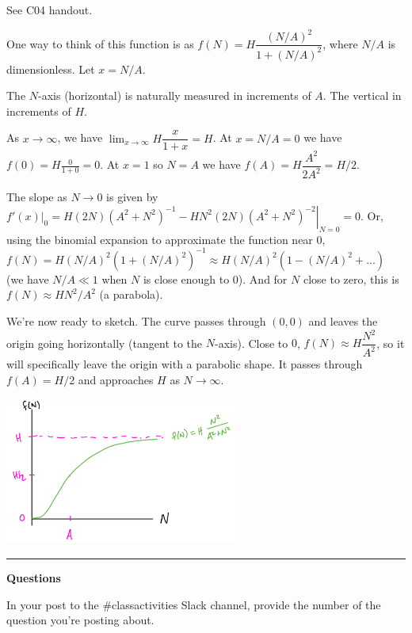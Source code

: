 \documentclass[12pt,letterpaper,noanswers]{exam}
\begin{document}
\begin{questions}
\question See C04 handout.
\question 

One way to think of this function is as $f(N) = H \dfrac{(N/A)^2}{1+(N/A)^2}$, where $N/A$ is dimensionless.  Let $ x = N/A$.  

The $N$-axis (horizontal) is naturally measured in increments of $A$.  The vertical in increments of $H$.  

As $x\rightarrow \infty$, we have $\lim_{x\rightarrow \infty} H \dfrac{x}{1+x} = H$.  At $x = N/A = 0$ we have $f(0) = H\frac{0}{1+0} = 0$.  At $x = 1$ so $N = A$ we have $f(A) = H\dfrac{A^2}{2A^2} = H/2$.  

The slope as $N\rightarrow 0$ is given by $\left.f'(x)\right\vert_0 = \left.H(2N)(A^2+N^2)^{-1}-HN^2(2N)(A^2+N^2)^{-2}\right\vert_{N=0} = 0$.  Or, using the binomial expansion to approximate the function near $0$, $f(N)= H(N/A)^2(1+(N/A)^2)^{-1} \approx H(N/A)^2(1 - (N/A)^2 + ...)$ (we have $N/A \ll 1$ when $N$ is close enough to $0$).  And for $N$ close to zero, this is $f(N) \approx HN^2/A^2$ (a parabola).

We're now ready to sketch.  The curve passes through $(0,0)$ and leaves the origin going horizontally (tangent to the $N$-axis).  Close to $0$, $f(N) \approx H \dfrac{N^2}{A^2}$, so it will specifically leave the origin with a parabolic shape.  It passes through $f(A) = H/2$ and approaches $H$ as $N \rightarrow\infty$.

\includegraphics[width=3in]{img/C08soln-Hillfcnplot-p1.png}

\end{questions}

\vspace{0.2cm}

\hrule
\vspace{0.2cm}

\noindent\textbf{Questions}


In your post to the \#classactivities Slack channel, provide the number of the question you're posting about.
\end{document}
